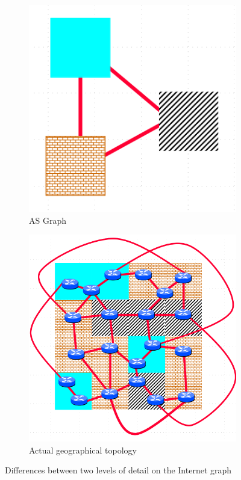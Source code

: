 \begin{figure}[ht]
     \centering
     \begin{subfigure}[b]{0.45\textwidth}
         \centering
         \includegraphics[width=\textwidth]{images/BGP/ASTopology.png}
		 \caption{\ac{AS} Graph}
         \label{fig:as_graph}
     \end{subfigure}
     \hfill
     \begin{subfigure}[b]{0.45\textwidth}
         \centering
         \includegraphics[width=\textwidth]{images/BGP/InternetTopology.png}
		 \caption{Actual geographical topology}
         \label{fig:actual_topology}
     \end{subfigure}
		\caption{Differences between two levels of detail on the Internet graph
			}
        \label{fig:astopology_vs_internet}
\end{figure}
